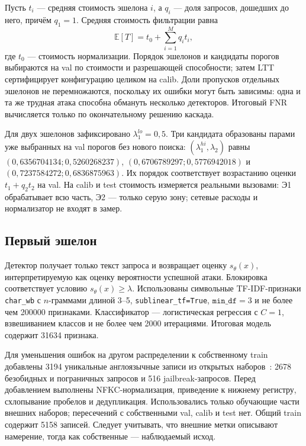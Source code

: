 \documentclass{misisarticle}
\begin{document}
Пусть $t_i$ --- средняя стоимость эшелона $i$, а $q_i$ --- доля запросов, дошедших до него, причём $q_1=1$. Средняя стоимость фильтрации равна
\begin{equation}
\mathbb{E}[T]=t_0+\sum_{i=1}^{M}q_i t_i,
\label{eq:cost}
\end{equation}
где $t_0$ --- стоимость нормализации. Порядок эшелонов и кандидаты порогов выбираются на val по стоимости и разрешающей способности; затем LTT сертифицирует конфигурацию целиком на calib. Доли пропусков отдельных эшелонов не перемножаются, поскольку их ошибки могут быть зависимы: одна и та же трудная атака способна обмануть несколько детекторов. Итоговый FNR вычисляется только по окончательному решению каскада.

Для двух эшелонов зафиксировано $\lambda_1^{lo}=0{,}5$. Три кандидата образованы парами уже выбранных на val порогов без нового поиска: $(\lambda_1^{hi},\lambda_2)$ равны $(0{,}6356704134;0{,}5260268237)$, $(0{,}6706789297;0{,}5776942018)$ и $(0{,}7237584272;0{,}6836875963)$. Их порядок соответствует возрастанию оценки $t_1+q_2t_2$ на val. На calib и test стоимость измеряется реальными вызовами: Э1 обрабатывает всю часть, Э2 --- только серую зону; сетевые расходы и нормализатор не входят в замер.

\subsection{Первый эшелон}

Детектор получает только текст запроса и возвращает оценку $s_\theta(x)$, интерпретируемую как оценку вероятности успешной атаки. Блокировка соответствует условию $s_\theta(x)\geq\lambda$. Использованы символьные TF-IDF-признаки \texttt{char\_wb} с $n$-граммами длиной 3--5, \texttt{sublinear\_tf=True}, $\texttt{min\_df}=3$ и не более чем 200000 признаками. Классификатор --- логистическая регрессия с $C=1$, взвешиванием классов и не более чем 2000 итерациями. Итоговая модель содержит 31634 признака.

Для уменьшения ошибок на другом распределении к собственному train добавлены 3194 уникальные англоязычные записи из открытых наборов~\cite{neuralchemy, dolly15k}: 2678 безобидных и пограничных запросов и 516 jailbreak-запросов. Перед добавлением выполнены NFKC-нормализация, приведение к нижнему регистру, схлопывание пробелов и дедупликация. Использовались только обучающие части внешних наборов; пересечений с собственными val, calib и test нет. Общий train содержит 5158 записей. Следует учитывать, что внешние метки описывают намерение, тогда как собственные --- наблюдаемый исход.
\end{document}
